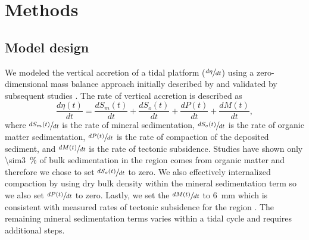 \section{Methods}

\subsection{Model design}

We modeled the vertical accretion of a tidal platform ($\sfrac{d\eta}{dt}$) using a zero-dimensional mass balance approach initially described by \citet{kroneMethodSimulatingMarsh1987} and validated by subsequent studies \citep{allenSaltmarshGrowthStratification1990, frenchNumericalSimulationVertical1993, temmermanModellingLongtermTidal2003,temmermanModellingEstuarineVariations2004}. The rate of vertical accretion is described as
\begin{equation}\label{eq:mass_bal}
	\frac{d\eta(t)}{dt} = \frac{dS_m(t)}{dt} + \frac{dS_o(t)}{dt} + \frac{dP(t)}{dt} + \frac{dM(t)}{dt},
\end{equation}
where $\sfrac{dS_m(t)}{dt}$ is the rate of mineral sedimentation, $\sfrac{dS_o(t)}{dt}$ is the rate of organic matter sedimentation, $\sfrac{dP(t)}{dt}$ is the rate of compaction of the deposited sediment, and $\sfrac{dM(t)}{dt}$ is the rate of tectonic subsidence. Studies  have shown only \SI{\sim3}{\percent} of bulk sedimentation in the region comes from organic matter and therefore we chose to set $\sfrac{dS_o(t)}{dt}$ to zero. We also effectively internalized compaction by using dry bulk density within the mineral sedimentation term so we also set $\sfrac{dP(t)}{dt}$ to zero. Lastly, we set the $\sfrac{dM(t)}{dt}$ to \SI{6}{\milli\meter} which is consistent with measured rates of tectonic subsidence for the region \cite{higginsInSARMeasurementsCompaction2014a} . The remaining mineral sedimentation terms varies within a tidal cycle and requires additional steps.

